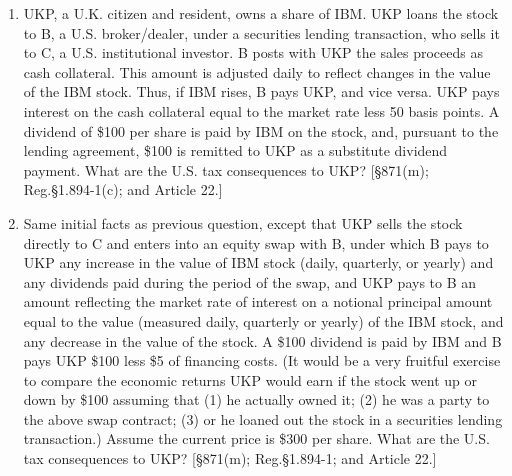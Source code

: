 \begin{select}
\begin{enumerate}
			\item UKP, a U.K. citizen and resident, owns a share of IBM.  UKP loans the stock to B, a U.S. broker/dealer, under a securities lending transaction, who sells it to C, a U.S. institutional investor.  B posts with UKP the sales proceeds as cash collateral.  This amount is adjusted daily to reflect changes in the value of the IBM stock.  Thus, if IBM rises, B pays UKP, and vice versa.  UKP pays interest on the cash collateral equal to the market rate less 50 basis points.  A dividend of \$100 per share is paid by IBM on the stock, and, pursuant to the lending agreement, \$100 is remitted to UKP as a substitute dividend payment.  What are the U.S. tax consequences to UKP?  [\S871(m); Reg.\@ \S1.894-1(c); and Article 22.]	
			
				\item Same initial facts as previous question, except that UKP sells the stock directly to C and enters into an equity swap with B, under which B pays to UKP any increase in the value of IBM stock (daily, quarterly, or yearly) and any dividends paid during the period of the swap, and UKP pays to B an amount reflecting the market rate of interest on a notional principal amount equal to the value (measured daily, quarterly or yearly) of the IBM stock, and any decrease in the value of the stock.  A \$100 dividend is paid by IBM and B pays UKP \$100 less \$5 of financing costs.  (It would be a very fruitful exercise to compare the economic returns UKP would earn if the stock went up or down by \$100 assuming that (1) he actually owned it;  (2) he was a party to the above swap contract; (3) or he loaned out the stock in a securities lending transaction.)  Assume the current price is \$300 per share.  What are the U.S. tax consequences to UKP? [\S871(m); Reg.\@ \S1.894-1; and Article 22.]
 \end{enumerate}
 	\end{select}

\begin{framed}
	\end{framed}